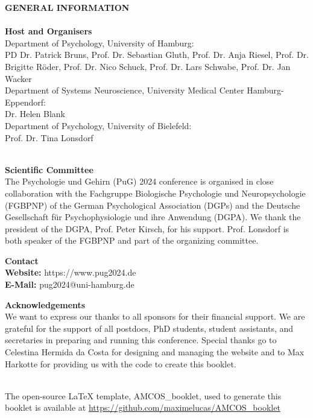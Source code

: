 \vspace*{1cm}
\begin{center}
	\textbf{GENERAL INFORMATION} \\
	\ \\[\baselineskip]

	\textcolor{\primarycolor}{\textbf{Host and Organisers}}	 \\
	Department of Psychology, University of Hamburg: \\
	PD Dr. Patrick Bruns, Prof. Dr. Sebastian Gluth, Prof. Dr. Anja Riesel, Prof. Dr. Brigitte Röder, Prof. Dr. Nico Schuck, Prof. Dr. Lars Schwabe, Prof. Dr. Jan Wacker \\
	\vspace*{0.1cm}
	Department of Systems Neuroscience, University Medical Center Hamburg-Eppendorf: \\
	Dr. Helen Blank \\
	\vspace*{0.1cm}
	Department of Psychology, University of Bielefeld: \\
	Prof. Dr. Tina Lonsdorf \\
	\ \\[\baselineskip]
	\vspace*{0.1cm}
	
	\textcolor{\primarycolor}{\textbf {Scientific Committee}}	 \\
	The Psychologie und Gehirn (PuG) 2024 conference is organised in close collaboration with the Fachgruppe Biologische Psychologie und Neuropsychologie (FGBPNP) of the German Psychological Association (DGPs) and the Deutsche Gesellschaft für Psychophysiologie und ihre Anwendung (DGPA). We thank the president of the DGPA, Prof. Peter Kirsch, for his support. Prof. Lonsdorf is both speaker of the FGBPNP and part of the organizing committee.
	\\[\baselineskip]
	\vspace*{0.1cm}

	\textcolor{\primarycolor}{\textbf {Contact}}	 \\
	\textbf{Website:} https://www.pug2024.de \\
	\textbf{E-Mail:} pug2024@uni-hamburg.de
	\\[\baselineskip]
	\vspace*{0.1cm}

	\textcolor{\primarycolor}{\textbf {Acknowledgements}}	 \\
	We want to express our thanks to all sponsors for their financial support. We are grateful for the support of all postdocs, PhD students, student assistants, and secretaries in preparing and running this conference. Special thanks go to Celestina Hermida da Costa for designing and managing the website and to Max Harkotte for providing us with the code to create this booklet.

\end{center}
\mbox{}
\thispagestyle{empty}
\vfill
\begin{center}
	\ \\[20pt] %
	The open-source \LaTeX{} template, AMCOS\_booklet, used to generate this booklet is available at \url{https://github.com/maximelucas/AMCOS\_booklet}
\end{center}

\newpage
